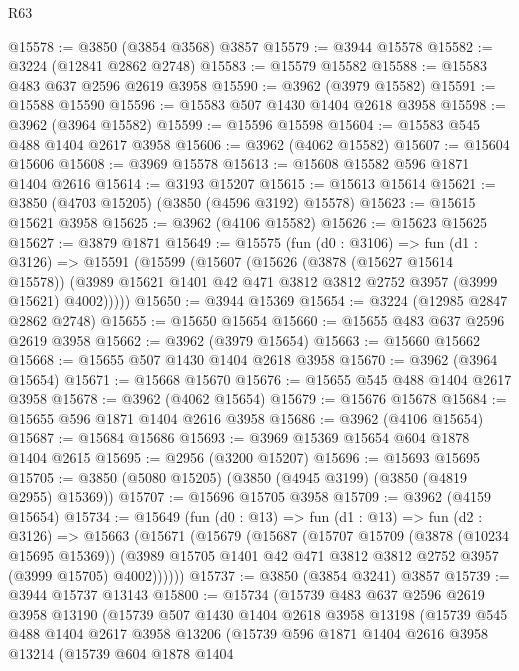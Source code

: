 \begin{lexlean}{R63}
\begin{coremodule}
@15578 := @3850 (@3854 @3568) @3857
@15579 := @3944 @15578
@15582 := @3224 (@12841 @2862 @2748)
@15583 := @15579 @15582
@15588 := @15583 @483 @637 @2596 @2619 @3958
@15590 := @3962 (@3979 @15582)
@15591 := @15588 @15590
@15596 := @15583 @507 @1430 @1404 @2618 @3958
@15598 := @3962 (@3964 @15582)
@15599 := @15596 @15598
@15604 := @15583 @545 @488 @1404 @2617 @3958
@15606 := @3962 (@4062 @15582)
@15607 := @15604 @15606
@15608 := @3969 @15578
@15613 := @15608 @15582 @596 @1871 @1404 @2616
@15614 := @3193 @15207
@15615 := @15613 @15614
@15621 := @3850 (@4703 @15205) (@3850 (@4596 @3192) @15578)
@15623 := @15615 @15621 @3958
@15625 := @3962 (@4106 @15582)
@15626 := @15623 @15625
@15627 := @3879 @1871
@15649 := @15575
    (fun (d0 : @3106) =>
    fun (d1 : @3126) =>
    @15591
      (@15599
        (@15607
          (@15626
            (@3878 (@15627 @15614 @15578))
            (@3989 @15621 @1401 @42 @471 @3812 @3812 @2752 @3957 (@3999 @15621) @4002)))))
@15650 := @3944 @15369
@15654 := @3224 (@12985 @2847 @2862 @2748)
@15655 := @15650 @15654
@15660 := @15655 @483 @637 @2596 @2619 @3958
@15662 := @3962 (@3979 @15654)
@15663 := @15660 @15662
@15668 := @15655 @507 @1430 @1404 @2618 @3958
@15670 := @3962 (@3964 @15654)
@15671 := @15668 @15670
@15676 := @15655 @545 @488 @1404 @2617 @3958
@15678 := @3962 (@4062 @15654)
@15679 := @15676 @15678
@15684 := @15655 @596 @1871 @1404 @2616 @3958
@15686 := @3962 (@4106 @15654)
@15687 := @15684 @15686
@15693 := @3969 @15369 @15654 @604 @1878 @1404 @2615
@15695 := @2956 (@3200 @15207)
@15696 := @15693 @15695
@15705 := @3850 (@5080 @15205) (@3850 (@4945 @3199) (@3850 (@4819 @2955) @15369))
@15707 := @15696 @15705 @3958
@15709 := @3962 (@4159 @15654)
@15734 := @15649
    (fun (d0 : @13) =>
    fun (d1 : @13) =>
    fun (d2 : @3126) =>
    @15663
      (@15671
        (@15679
          (@15687
            (@15707
              @15709
              (@3878 (@10234 @15695 @15369))
              (@3989 @15705 @1401 @42 @471 @3812 @3812 @2752 @3957 (@3999 @15705) @4002))))))
@15737 := @3850 (@3854 @3241) @3857
@15739 := @3944 @15737 @13143
@15800 := @15734
    (@15739
      @483
      @637
      @2596
      @2619
      @3958
      @13190
      (@15739
        @507
        @1430
        @1404
        @2618
        @3958
        @13198
        (@15739
          @545
          @488
          @1404
          @2617
          @3958
          @13206
          (@15739
            @596
            @1871
            @1404
            @2616
            @3958
            @13214
            (@15739
              @604
              @1878
              @1404

\end{coremodule}
\end{lexlean}
